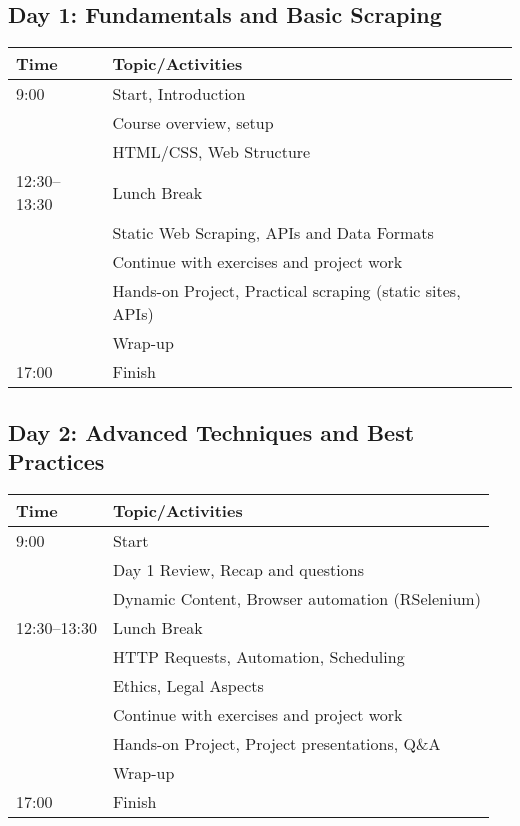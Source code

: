 \documentclass[12pt]{article}
\begin{document}
\subsection*{Day 1: Fundamentals and Basic Scraping}
\FloatBarrier
\begin{table}[!ht]
\begin{tabular}{ll}
\toprule
Time & Topic/Activities \\
\midrule
9:00 & Start, Introduction \\
& Course overview, setup \\
 & HTML/CSS, Web Structure  \\
12:30--13:30 & Lunch Break \\
& Static Web Scraping, APIs and Data Formats \\
 & Continue with exercises and project work \\
 & Hands-on Project, Practical scraping (static sites, APIs) \\
 & Wrap-up \\
17:00 & Finish \\
\bottomrule
\end{tabular}
\end{table}
\FloatBarrier

\subsection*{Day 2: Advanced Techniques and Best Practices}
\FloatBarrier

\begin{table}[h]
\begin{tabular}{ll}
\toprule
Time & Topic/Activities \\
\midrule
9:00 & Start \\
& Day 1 Review, Recap and questions \\
 & Dynamic Content, Browser automation (RSelenium) \\
12:30--13:30 & Lunch Break \\
 & HTTP Requests, Automation, Scheduling \\
 & Ethics, Legal Aspects \\
 & Continue with exercises and project work \\
 & Hands-on Project, Project presentations, Q\&A \\
 & Wrap-up \\
17:00 & Finish \\
\bottomrule
\end{tabular}
\end{table}
\FloatBarrier
\end{document}
